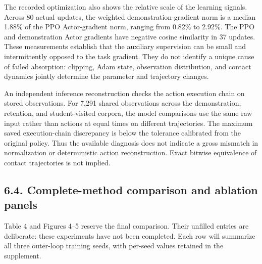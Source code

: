 \documentclass[
  american,
  11pt,
  a4paper,
]{article}
\begin{document}
The recorded optimization also shows the relative scale of the learning
signals. Across 80 actual updates, the weighted demonstration-gradient
norm is a median 1.88\% of the PPO Actor-gradient norm, ranging from
0.82\% to 2.92\%. The PPO and demonstration Actor gradients have
negative cosine similarity in 37 updates. These measurements establish
that the auxiliary supervision can be small and intermittently opposed
to the task gradient. They do not identify a unique cause of failed
absorption: clipping, Adam state, observation distribution, and contact
dynamics jointly determine the parameter and trajectory changes.

An independent inference reconstruction checks the action execution
chain on stored observations. For 7,291 shared observations across the
demonstration, retention, and student-visited corpora, the model
comparisons use the same raw input rather than actions at equal times on
different trajectories. The maximum saved execution-chain discrepancy is
below the tolerance calibrated from the original policy. Thus the
available diagnosis does not indicate a gross mismatch in normalization
or deterministic action reconstruction. Exact bitwise equivalence of
contact trajectories is not implied.

\subsection{6.4. Complete-method comparison and ablation
panels}\label{complete-method-comparison-and-ablation-panels}

Table 4 and Figures 4--5 reserve the final comparison. Their unfilled
entries are deliberate: these experiments have not been completed. Each
row will summarize all three outer-loop training seeds, with per-seed
values retained in the supplement.
\end{document}
